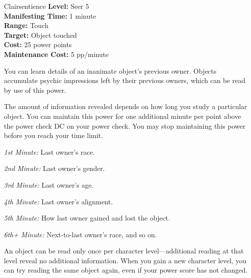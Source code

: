 {Clairsentience}
{
	\textbf{Level:}
	Seer 5\\
	\textbf{Manifesting Time:}
	1 minute\\
	\textbf{Range:}
	Touch\\
	\textbf{Target:}
	Object touched\\
	\textbf{Cost:}
	25 power points\\
	\textbf{Maintenance Cost:}
	5 pp/minute\\
}
{
	You can learn details of an inanimate object's previous owner. Objects accumulate psychic impressions left by their previous owners, which can be read by use of this power.

	The amount of information revealed depends on how long you study a particular object. You can maintain this power for one additional minute per point above the power check DC on your power check. You may stop maintaining this power before you reach your time limit.

	\textit{1st Minute:} Last owner's race.

	\textit{2nd Minute:} Last owner's gender.

	\textit{3rd Minute:} Last owner's age.

	\textit{4th Minute:} Last owner's alignment.

	\textit{5th Minute:} How last owner gained and lost the object.

	\textit{6th+ Minute:} Next-to-last owner's race, and so on.

	An object can be read only once per character level---additional reading at that level reveal no additional information. When you gain a new character level, you can try reading the same object again, even if your power score has not changed.
}